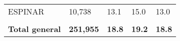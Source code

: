 \begin{tabular}{lllll}
	\cellcolor[HTML]{FF5050}ESPINAR                                & 10,738                                                                & 13.1                                                                             & 15.0                                                                        & 13.0                                                                                \\
	&                                                                       &                                                                                  &                                                                             &                                                                                     \\
	\rowcolor[HTML]{DDEBF7} 
	\textbf{Total   general}                                       & \textbf{251,955}                                                      & \textbf{18.8}                                                                    & \textbf{19.2}                                                               & \textbf{18.8}                                                                      
\end{tabular}
